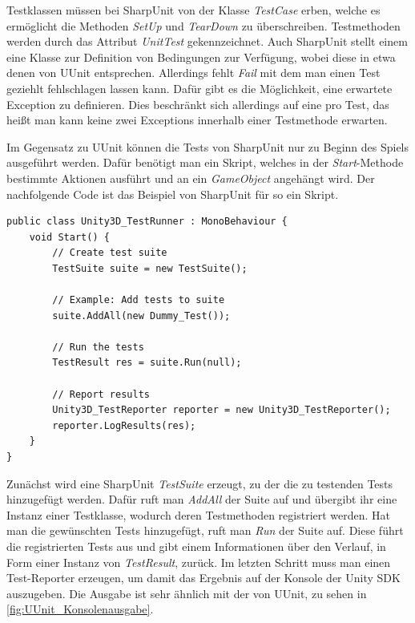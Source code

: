 Testklassen müssen bei SharpUnit von der Klasse \textit{TestCase} erben, welche es ermöglicht die Methoden \textit{SetUp} und \textit{TearDown} zu überschreiben. Testmethoden werden durch das Attribut \textit{UnitTest} gekennzeichnet. Auch SharpUnit stellt einem eine Klasse zur Definition von Bedingungen zur Verfügung, wobei diese in etwa denen von UUnit entsprechen. Allerdings fehlt \textit{Fail} mit dem man einen Test geziehlt fehlschlagen lassen kann. Dafür gibt es die Möglichkeit, eine erwartete Exception zu definieren. Dies beschränkt sich allerdings auf eine pro Test, das heißt man kann keine zwei Exceptions innerhalb einer Testmethode erwarten.
 
Im Gegensatz zu UUnit können die Tests von SharpUnit nur zu Beginn des Spiels ausgeführt werden. Dafür benötigt man ein Skript, welches in der \textit{Start}-Methode bestimmte Aktionen ausführt und an ein \textit{GameObject} angehängt wird. Der nachfolgende Code ist das Beispiel von SharpUnit für so ein Skript.
\pagebreak

\begin{lstlisting}[caption={[Einbindung der Tests mit SharpUnit]Einbindung der Tests mit SharpUnit\\
Quelle: Demo von SharpUnit, erhältlich unter \url{https://github.com/mgants4/SharpUnit}.}, label=code:SharpUnitTestRunner]
public class Unity3D_TestRunner : MonoBehaviour {
	void Start() {
        // Create test suite
        TestSuite suite = new TestSuite();

        // Example: Add tests to suite
        suite.AddAll(new Dummy_Test());

        // Run the tests
        TestResult res = suite.Run(null);

        // Report results
        Unity3D_TestReporter reporter = new Unity3D_TestReporter();
        reporter.LogResults(res);
	}
}
\end{lstlisting}

Zunächst wird eine SharpUnit \textit{TestSuite} erzeugt, zu der die zu testenden Tests hinzugefügt werden. Dafür ruft man \textit{AddAll} der Suite auf und übergibt ihr eine Instanz einer Testklasse, wodurch deren Testmethoden registriert werden. Hat man die gewünschten Tests hinzugefügt, ruft man \textit{Run} der Suite auf. Diese führt die registrierten Tests aus und gibt einem Informationen über den Verlauf, in Form einer Instanz von \textit{TestResult}, zurück. Im letzten Schritt muss man einen Test-Reporter erzeugen, um damit das Ergebnis auf der Konsole der Unity SDK auszugeben. Die Ausgabe ist sehr ähnlich mit der von UUnit, zu sehen in \autoref{fig:UUnit_Konsolenausgabe}.
\pagebreak


